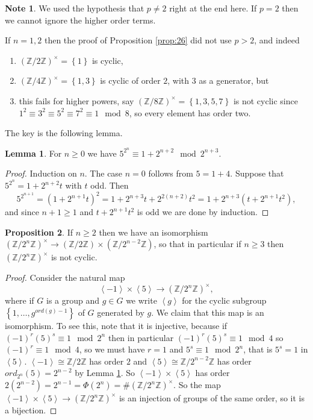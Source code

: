 \documentclass{article}
\newcommand{\Z}{\mathbb{Z}}
\newcommand{\rb}[1]{\left( #1 \right)}
\newcommand{\cb}[1]{\left\{ #1 \right\}}
\newcommand{\ab}[1]{\left\langle #1 \right\rangle}
\newcommand{\unit}[1]{\rb{\Z / #1\Z}^\times}
\theoremstyle{definition}\newtheorem{definition}{Definition}
\theoremstyle{definition}\newtheorem*{remark}{Remark}
\theoremstyle{definition}\newtheorem*{example}{Example}
\theoremstyle{definition}\newtheorem*{note}{Note}
\newtheorem{proposition}[definition]{Proposition}
\newtheorem{lemma}[definition]{Lemma}
\begin{document}
\begin{note}
We used the hypothesis that $ p \ne 2 $ right at the end here. If $ p = 2 $ then we cannot ignore the higher order terms.
\end{note}

If $ n = 1, 2 $ then the proof of Proposition \ref{prop:26} did not use $ p > 2 $, and indeed
\begin{enumerate}
\item $ \unit{2} = \cb{1} $ is cyclic,
\item $ \unit{4} = \cb{1, 3} $ is cyclic of order $ 2 $, with $ 3 $ as a generator, but
\item this fails for higher powers, say $ \unit{8} = \cb{1, 3, 5, 7} $ is not cyclic since $ 1^2 \equiv 3^2 \equiv 5^2 \equiv 7^2 \equiv 1 \mod 8 $, so every element has order two.
\end{enumerate}
The key is the following lemma.

\begin{lemma}
\label{lem:27}
For $ n \ge 0 $ we have $ 5^{2^n} \equiv 1 + 2^{n + 2} \mod 2^{n + 3} $.
\end{lemma}

\begin{proof}
Induction on $ n $. The case $ n = 0 $ follows from $ 5 = 1 + 4 $. Suppose that $ 5^{2^n} = 1 + 2^{n + 2}t $ with $ t $ odd. Then
$$ 5^{2^{n + 1}} = \rb{1 + 2^{n + 1}t}^2 = 1 + 2^{n + 3}t + 2^{2\rb{n + 2}}t^2 = 1 + 2^{n + 3}\rb{t + 2^{n + 1}t^2}, $$
and since $ n + 1 \ge 1 $ and $ t + 2^{n + 1}t^2 $ is odd we are done by induction.
\end{proof}

\begin{proposition}
If $ n \ge 2 $ then we have an isomorphism $ \unit{2^n} \to \rb{\Z / 2\Z} \times \rb{\Z / 2^{n - 2}\Z} $, so that in particular if $ n \ge 3 $ then $ \unit{2^n} $ is not cyclic.
\end{proposition}

\begin{proof}
Consider the natural map
$$ \ab{-1} \times \ab{5} \to \unit{2^n}, $$
where if $ G $ is a group and $ g \in G $ we write $ \ab{g} $ for the cyclic subgroup $ \cb{1, \dots, g^{ord\rb{g} - 1}} $ of $ G $ generated by $ g $. We claim that this map is an isomorphism. To see this, note that it is injective, because if $ \rb{-1}^r\rb{5}^s \equiv 1 \mod 2^n $ then in particular $ \rb{-1}^r\rb{5}^s \equiv 1 \mod 4 $ so $ \rb{-1}^r \equiv 1 \mod 4 $, so we must have $ r = 1 $ and $ 5^s \equiv 1 \mod 2^n $, that is $ 5^s = 1 $ in $ \ab{5} $. $ \ab{-1} \cong \Z / 2\Z $ has order $ 2 $ and $ \ab{5} \cong \Z / 2^{n - 2}\Z $ has order $ ord_{2^n}\rb{5} = 2^{n - 2} $ by Lemma \ref{lem:27}. So $ \ab{-1} \times \ab{5} $ has order $ 2\rb{2^{n - 2}} = 2^{n - 1} = \Phi\rb{2^n} = \#\unit{2^n} $. So the map $ \ab{-1} \times \ab{5} \to \unit{2^n} $ is an injection of groups of the same order, so it is a bijection.
\end{proof}
\end{document}
